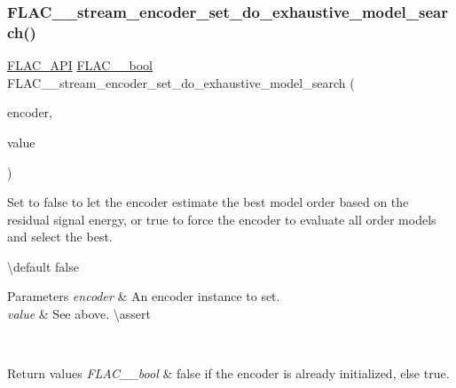 \subsubsection{\texorpdfstring{FLAC\_\_stream\_encoder\_set\_do\_exhaustive\_model\_search()}{FLAC\_\_stream\_encoder\_set\_do\_exhaustive\_model\_search()}}
{\footnotesize\ttfamily \mbox{\hyperlink{group__flac__export_ga56ca07df8a23310707732b1c0007d6f5}{F\+L\+A\+C\+\_\+\+A\+PI}} \mbox{\hyperlink{ordinals_8h_a95103469f1cbd78b8cf250194985b34e}{F\+L\+A\+C\+\_\+\+\_\+bool}} F\+L\+A\+C\+\_\+\+\_\+stream\+\_\+encoder\+\_\+set\+\_\+do\+\_\+exhaustive\+\_\+model\+\_\+search (\begin{DoxyParamCaption}\item[{\mbox{\hyperlink{struct_f_l_a_c_____stream_encoder}{F\+L\+A\+C\+\_\+\+\_\+\+Stream\+Encoder}} $\ast$}]{encoder,  }\item[{\mbox{\hyperlink{ordinals_8h_a95103469f1cbd78b8cf250194985b34e}{F\+L\+A\+C\+\_\+\+\_\+bool}}}]{value }\end{DoxyParamCaption})}

Set to {\ttfamily false} to let the encoder estimate the best model order based on the residual signal energy, or {\ttfamily true} to force the encoder to evaluate all order models and select the best.

\textbackslash{}default {\ttfamily false} 
\begin{DoxyParams}{Parameters}
{\em encoder} & An encoder instance to set. \\
\hline
{\em value} & See above. \textbackslash{}assert 
\begin{DoxyCode}{1}
\end{DoxyCode}
 \\
\hline
\end{DoxyParams}

\begin{DoxyRetVals}{Return values}
{\em F\+L\+A\+C\+\_\+\+\_\+bool} & {\ttfamily false} if the encoder is already initialized, else {\ttfamily true}. \\
\hline
\end{DoxyRetVals}
\mbox{\label{group__flac__stream__encoder_gadbd1084da109cf0ddd007a5c64027504}} 
